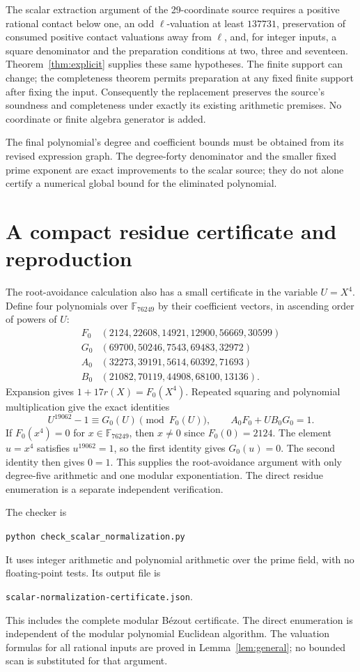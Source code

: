 \documentclass[11pt,a4paper]{article}
\begin{document}
The scalar extraction argument of the 29-coordinate source
requires a positive rational contact below one, an odd
$\ell$-valuation at least $137731$, preservation of consumed
positive contact valuations away from $\ell$, and, for integer
inputs, a square denominator and the preparation conditions at
two, three and seventeen. Theorem~\ref{thm:explicit} supplies
these same hypotheses. The finite support can change; the
completeness theorem permits preparation at any fixed finite
support after fixing the input. Consequently the replacement
preserves the source's soundness and completeness under exactly
its existing arithmetic premises. No coordinate or finite
algebra generator is added.

The final polynomial's degree and coefficient bounds must be
obtained from its revised expression graph. The degree-forty
denominator and the smaller fixed prime exponent are exact
improvements to the scalar source; they do not alone certify
a numerical global bound for the eliminated polynomial.

\clearpage
\section{A compact residue certificate and reproduction}

The root-avoidance calculation also has a small certificate in
the variable $U=X^4$. Define four polynomials over
$\mathbb F_{76249}$ by their coefficient vectors, in ascending
order of powers of $U$:
\[
\begin{array}{c|l}
 F_0&(2124,22608,14921,12900,56669,30599)\\
 G_0&(69700,50246,7543,69483,32972)\\
 A_0&(32273,39191,5614,60392,71693)\\
 B_0&(21082,70119,44908,68100,13136).
\end{array}
\]
Expansion gives $1+17r(X)=F_0(X^4)$. Repeated squaring and
polynomial multiplication give the exact identities
\[
 U^{19062}-1\equiv G_0(U)\pmod{F_0(U)},\qquad
 A_0F_0+UB_0G_0=1.
\]
If $F_0(x^4)=0$ for $x\in\mathbb F_{76249}$, then $x\ne0$
since $F_0(0)=2124$. The element $u=x^4$ satisfies
$u^{19062}=1$, so the first identity gives $G_0(u)=0$.
The second identity then gives $0=1$. This supplies the
root-avoidance argument with only degree-five arithmetic and
one modular exponentiation. The direct residue enumeration
is a separate independent verification.

The checker is
\begin{center}
\texttt{python check\_scalar\_normalization.py}
\end{center}
It uses integer arithmetic and polynomial arithmetic over the
prime field, with no floating-point tests. Its output file is
\begin{center}
\texttt{scalar-normalization-certificate.json}.
\end{center}
This includes the complete modular B\'ezout certificate. The direct enumeration
is independent of the modular polynomial Euclidean algorithm.
The valuation formulas for all rational inputs are proved in
Lemma~\ref{lem:general}; no bounded scan is substituted for
that argument.
\end{document}
